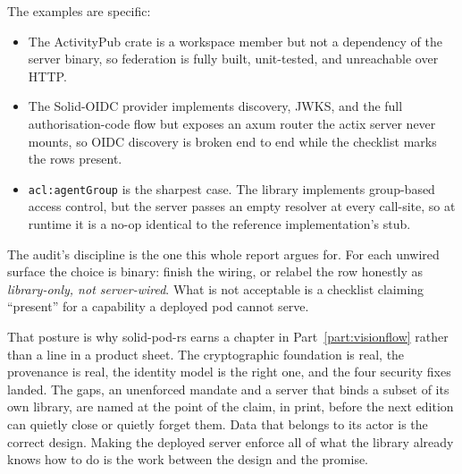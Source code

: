 The examples are specific:

\begin{itemize}
  \item The ActivityPub crate is a workspace member but not a dependency of the server binary, so federation is fully built, unit-tested, and unreachable over HTTP.
  \item The Solid-OIDC provider implements discovery, JWKS, and the full authorisation-code flow but exposes an axum router the actix server never mounts, so OIDC discovery is broken end to end while the checklist marks the rows present.
  \item \texttt{acl:agentGroup} is the sharpest case. The library implements group-based access control, but the server passes an empty resolver at every call-site, so at runtime it is a no-op identical to the reference implementation's stub.
\end{itemize}

The audit's discipline is the one this whole report argues for. For each unwired surface the choice is binary: finish the wiring, or relabel the row honestly as \emph{library-only, not server-wired}. What is not acceptable is a checklist claiming ``present'' for a capability a deployed pod cannot serve.

That posture is why solid-pod-rs earns a chapter in Part~\ref{part:visionflow} rather than a line in a product sheet. The cryptographic foundation is real, the provenance is real, the identity model is the right one, and the four security fixes landed. The gaps, an unenforced mandate and a server that binds a subset of its own library, are named at the point of the claim, in print, before the next edition can quietly close or quietly forget them. Data that belongs to its actor is the correct design. Making the deployed server enforce all of what the library already knows how to do is the work between the design and the promise.
